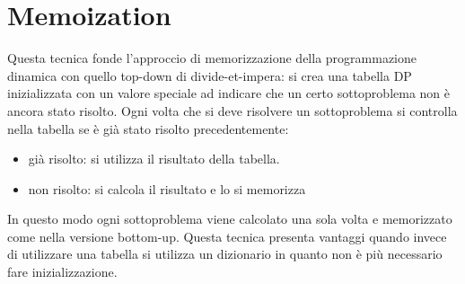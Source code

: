 \section{Memoization}
Questa tecnica fonde l'approccio di memorizzazione della programmazione dinamica con quello top-down di divide-et-impera: si crea una tabella DP inizializzata con un valore speciale ad indicare che un certo 
sottoproblema non \`e ancora stato risolto. Ogni volta che si deve risolvere un sottoproblema si controlla nella tabella se \`e gi\`a stato risolto precedentemente:
\begin{itemize}
\item gi\`a risolto: si utilizza il risultato della tabella.
\item non risolto: si calcola il risultato e lo si memorizza
\end{itemize}
In questo modo ogni sottoproblema viene calcolato una sola volta e memorizzato come nella versione bottom-up. Questa tecnica presenta vantaggi quando invece di utilizzare una tabella si utilizza un dizionario in
quanto non \`e pi\`u necessario fare inizializzazione.
